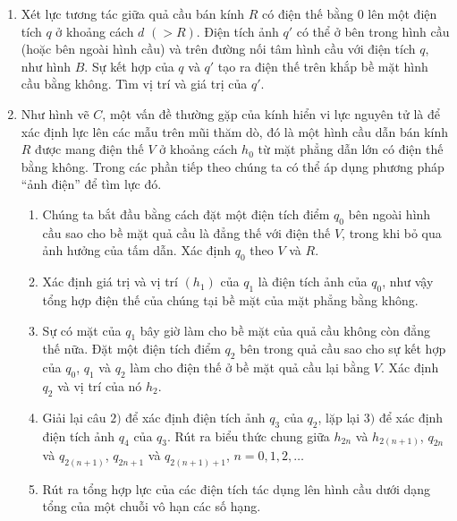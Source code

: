 \begin{vd}
\begin{center}
\begin{tikzpicture}[x=0.75pt,y=0.75pt,yscale=-1,xscale=1]
\end{tikzpicture}
\end{center}
\begin{enumerate}
    \item 
    Xét lực tương tác giữa quả cầu bán kính $R$ có điện thế bằng $0$ lên một điện tích $q$ ở khoảng cách $d$ $(>R)$. Điện tích ảnh $q'$ có thể ở bên trong hình cầu
    (hoặc bên ngoài hình cầu) và trên đường nối tâm hình cầu với điện tích $q$, như hình $B$. Sự kết hợp của $q$ và $q'$ tạo ra điện thế trên khắp bề mặt hình cầu bằng không. Tìm vị trí và giá trị của $q'$.
    \item Như hình vẽ $C$, một vấn đề thường gặp của kính hiển vi lực nguyên tử là để xác định lực lên các mẫu trên mũi thăm dò, đó là một hình cầu dẫn bán kính $R$ được mang điện thế $V$ ở khoảng cách $h_0$ từ mặt phẳng dẫn lớn có điện thế bằng không. Trong các phần tiếp theo chúng ta có thể áp dụng phương pháp ``ảnh điện'' để tìm lực đó.
    \begin{enumerate}[1) ]
        \item Chúng ta bắt đầu bằng cách đặt một điện tích điểm $q_0$ bên ngoài hình cầu sao cho bề mặt quả cầu là đẳng thế với điện thế $V$, trong khi bỏ qua ảnh hưởng của tấm dẫn. Xác định $q_0$ theo $V$ và $R$.
        \item Xác định giá trị và vị trí $(h_1)$ của $q_1$ là điện tích ảnh của $q_0$, như vậy tổng hợp điện thế của chúng tại bề mặt của mặt phẳng bằng không.
        \item Sự có mặt của $q_1$ bây giờ làm cho bề mặt của quả cầu không còn đẳng thế nữa. Đặt một điện tích điểm $q_2$ bên trong quả cầu sao cho sự kết hợp của $q_0$, $q_1$ và $q_2$ làm cho điện thế ở bề mặt quả cầu lại bằng $V$. Xác định $q_2$ và vị trí của nó $h_2$.
        \item Giải lại câu $2)$ để xác định điện tích ảnh $q_3$  của $q_2$, lặp lại $3)$ để xác định điện tích ảnh $q_4$ của $q_3$. Rút ra biểu thức chung giữa $h_{2n}$ và $h_{2(n+1)}$, $q_{2n}$ và $q_{2(n+1)}$, $q_{2n+1}$ và $q_{2(n+1)+1}$, $n=0,1,2,\dots$ 
        \item Rút ra tổng hợp lực của các điện tích tác dụng lên hình cầu dưới dạng tổng của một chuỗi vô hạn các số hạng. 

\end{enumerate}
\end{enumerate}
\end{vd}
